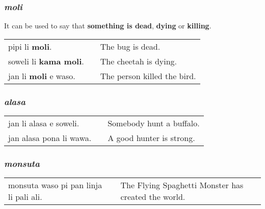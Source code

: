 \subsubsection*{\textit{moli}}
%
It can be used to say that \textbf{something is dead}, \textbf{dying} or \textbf{killing}.

\begin{supertabular}{p{5,5cm}|ll}
pipi li \textbf{moli}. && The bug is dead. \\
soweli li \textbf{kama moli}. && The cheetah is dying. \\
jan li \textbf{moli} e waso. && The person killed the bird. \\
\end{supertabular} 
%
\subsubsection*{\textit{alasa}}
\begin{supertabular}{p{5,5cm}|ll}
jan li alasa e soweli. && Somebody hunt a buffalo. \\
jan alasa pona li wawa. && A good hunter is strong. \\
\end{supertabular}

\subsubsection*{\textit{monsuta}}
\begin{supertabular}{p{5,5cm}|ll}
monsuta waso pi pan linja li pali ali. &&  The Flying Spaghetti Monster has created the world. \\
\end{supertabular}

